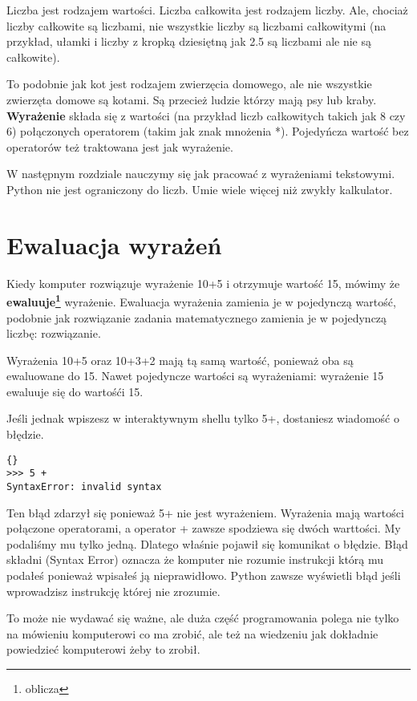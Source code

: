 \documentclass{book}
\begin{document}
Liczba jest rodzajem wartości. Liczba całkowita jest rodzajem liczby. Ale, chociaż liczby całkowite są liczbami, nie wszystkie liczby są liczbami całkowitymi (na przykład, ułamki i liczby z kropką dziesiętną jak 2.5 są liczbami ale nie są całkowite).

To podobnie jak kot jest rodzajem zwierzęcia domowego, ale nie wszystkie zwierzęta domowe są kotami. Są przecież ludzie którzy mają psy lub kraby. {\bf Wyrażenie} składa się z wartości (na przykład liczb całkowitych takich jak 8 czy 6) połączonych operatorem (takim jak znak mnożenia *). Pojedyńcza wartość bez operatorów też traktowana jest jak wyrażenie.

W następnym rozdziale nauczymy się jak pracować z wyrażeniami tekstowymi. Python nie jest ograniczony do liczb. Umie wiele więcej niż zwykły kalkulator.

\section{Ewaluacja wyrażeń}

Kiedy komputer rozwiązuje wyrażenie 10+5 i otrzymuje wartość 15, mówimy że {\bf ewaluuje\footnote{oblicza}} wyrażenie. Ewaluacja wyrażenia zamienia je w pojedynczą wartość, podobnie jak rozwiązanie zadania matematycznego zamienia je w pojedynczą liczbę: rozwiązanie.

Wyrażenia 10+5 oraz 10+3+2 mają tą samą wartość, ponieważ oba są ewaluowane do 15. Nawet pojedyncze wartości są wyrażeniami: wyrażenie 15 ewaluuje się do wartośći 15.

Jeśli jednak wpiszesz w interaktywnym shellu tylko 5+, dostaniesz wiadomość o błędzie.
\lstset{language=python}
\begin{lstlisting}{}
>>> 5 +
SyntaxError: invalid syntax
\end{lstlisting}

Ten błąd zdarzył się ponieważ 5+ nie jest wyrażeniem. Wyrażenia mają wartości połączone operatorami, a operator + zawsze spodziewa się dwóch warttości. My podaliśmy mu tylko jedną. Dlatego właśnie pojawił się komunikat o błędzie. Błąd składni (Syntax Error) oznacza że komputer nie rozumie instrukcji którą mu podałeś ponieważ wpisałeś ją nieprawidłowo. Python zawsze wyświetli błąd jeśli wprowadzisz instrukcję której nie zrozumie.

To może nie wydawać się ważne, ale duża część programowania polega nie tylko na mówieniu komputerowi co ma zrobić, ale też na wiedzeniu jak dokładnie powiedzieć komputerowi żeby to zrobił.
\end{document}
